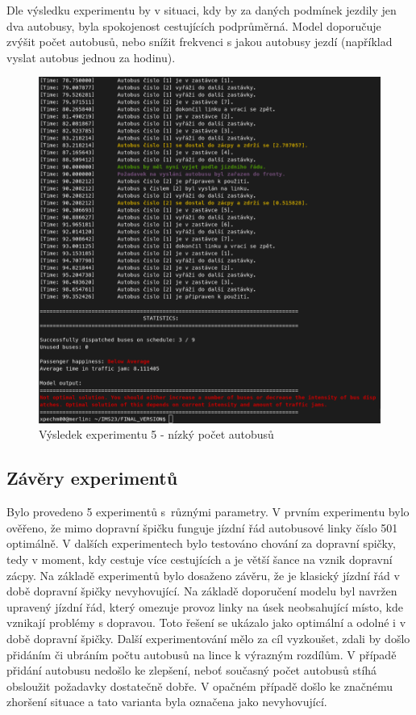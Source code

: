 \documentclass[a4paper]{article}
\begin{document}
            Dle výsledku experimentu by v situaci, kdy by za daných podmínek jezdily jen dva autobusy, byla spokojenost cestujících podprůměrná. Model doporučuje zvýšit počet autobusů, nebo snížit frekvenci s jakou autobusy jezdí (například vyslat autobus jednou za hodinu).
                
                \begin{figure}[H]
                \includegraphics[scale=0.37, keepaspectratio]{fig/ims_bus5.png}
                \caption{Výsledek experimentu 5 - nízký počet autobusů}
                \label{fig:experiment5}
            \end{figure}

        \subsection{Závěry experimentů}
        \label{subsec:experiments_summary}

            Bylo provedeno 5 experimentů s~různými parametry. V prvním experimentu bylo ověřeno, že mimo dopravní špičku funguje jízdní řád autobusové linky číslo 501 optimálně. V dalších experimentech bylo testováno chování za dopravní spičky, tedy v moment, kdy cestuje více cestujících a je větší šance na vznik dopravní zácpy. Na základě experimentů bylo dosaženo závěru, že je klasický jízdní řád v době dopravní špičky nevyhovující. Na základě doporučení modelu byl navržen upravený jízdní řád, který omezuje provoz linky na úsek neobsahující místo, kde vznikají problémy s dopravou. Toto řešení se ukázalo jako optimální a odolné i v době dopravní špičky. Další experimentování mělo za cíl vyzkoušet, zdali by došlo přidáním či ubráním počtu autobusů na lince k výrazným rozdílům. V případě přidání autobusu nedošlo ke zlepšení, neboť současný počet autobusů stíhá obsloužit požadavky dostatečně dobře. V opačném případě došlo ke značnému zhoršení situace a tato varianta byla označena jako nevyhovující.
            
\end{document}
